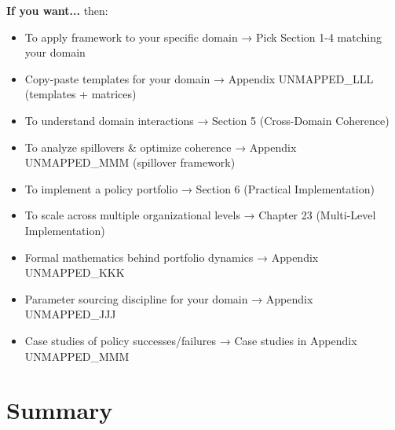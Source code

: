 \begin{tcolorbox}[colback=yellow!5!white, colframe=yellow!75!black, title=Where to Go Next]

\textbf{If you want...} then:
\begin{itemize}[nosep]
\item To apply framework to your specific domain → Pick Section 1-4 matching your domain
\item Copy-paste templates for your domain → Appendix UNMAPPED_LLL (templates + matrices)
\item To understand domain interactions → Section 5 (Cross-Domain Coherence)
\item To analyze spillovers & optimize coherence → Appendix UNMAPPED_MMM (spillover framework)
\item To implement a policy portfolio → Section 6 (Practical Implementation)
\item To scale across multiple organizational levels → Chapter 23 (Multi-Level Implementation)
\item Formal mathematics behind portfolio dynamics → Appendix UNMAPPED_KKK
\item Parameter sourcing discipline for your domain → Appendix UNMAPPED_JJJ
\item Case studies of policy successes/failures → Case studies in Appendix UNMAPPED_MMM
\end{itemize}

\end{tcolorbox}

\section{Summary}
\label{sec:ch22-summary}

